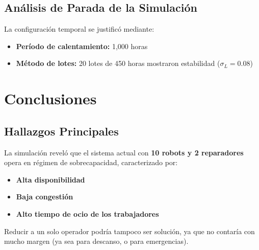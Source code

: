 \documentclass[12pt, a4paper]{article}
\begin{document}
\subsection{Análisis de Parada de la Simulación}
La configuración temporal se justificó mediante:
\begin{itemize}
    \item \textbf{Período de calentamiento:} 1,000 horas
    
    \item \textbf{Método de lotes:} 20 lotes de 450 horas mostraron estabilidad ($\sigma_{L} = 0.08$)
    
\end{itemize}

\section{Conclusiones}
\label{sec:conclusiones}

\subsection{Hallazgos Principales}
La simulación reveló que el sistema actual con \textbf{10 robots y 2 reparadores} opera en régimen de sobrecapacidad, caracterizado por:
\begin{itemize}
    \item \textbf{Alta disponibilidad}
    \item \textbf{Baja congestión}
    \item \textbf{Alto tiempo de ocio de los trabajadores}
\end{itemize}

    Reducir a un solo operador podría tampoco ser solución, ya que no contaría con mucho margen (ya sea para descanso, o para emergencias).

\begin{center}
\end{center}
\end{document}
